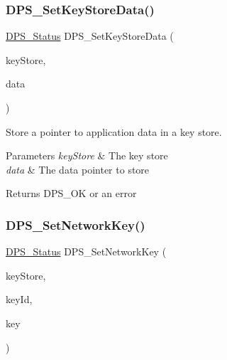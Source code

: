 \subsubsection{\texorpdfstring{D\+P\+S\+\_\+\+Set\+Key\+Store\+Data()}{DPS\_SetKeyStoreData()}}
{\footnotesize\ttfamily \hyperlink{group__status_ga30395a84d3cad9d4ec29848106415038}{D\+P\+S\+\_\+\+Status} D\+P\+S\+\_\+\+Set\+Key\+Store\+Data (\begin{DoxyParamCaption}\item[{\hyperlink{group__keystore_gaf3833cfe48f848f698514bc5daa075fa}{D\+P\+S\+\_\+\+Key\+Store} $\ast$}]{key\+Store,  }\item[{void $\ast$}]{data }\end{DoxyParamCaption})}



Store a pointer to application data in a key store. 


\begin{DoxyParams}{Parameters}
{\em key\+Store} & The key store \\
\hline
{\em data} & The data pointer to store\\
\hline
\end{DoxyParams}
\begin{DoxyReturn}{Returns}
D\+P\+S\+\_\+\+OK or an error 
\end{DoxyReturn}
\mbox{\label{group__keystore_ga8664b8c5cc2d3df6512ecb71e7f92212}} 
\subsubsection{\texorpdfstring{D\+P\+S\+\_\+\+Set\+Network\+Key()}{DPS\_SetNetworkKey()}}
{\footnotesize\ttfamily \hyperlink{group__status_ga30395a84d3cad9d4ec29848106415038}{D\+P\+S\+\_\+\+Status} D\+P\+S\+\_\+\+Set\+Network\+Key (\begin{DoxyParamCaption}\item[{\hyperlink{group__keystore_ga57f11410b3ef6a686594b60836dc8c99}{D\+P\+S\+\_\+\+Memory\+Key\+Store} $\ast$}]{key\+Store,  }\item[{const \hyperlink{group__keystore_ga4345e29dd2ad5d7fd88a1e988787bd72}{D\+P\+S\+\_\+\+Key\+Id} $\ast$}]{key\+Id,  }\item[{const \hyperlink{group__keystore_gaa56a1429b6a1658e674eea558bdbbfc0}{D\+P\+S\+\_\+\+Key} $\ast$}]{key }\end{DoxyParamCaption})}



